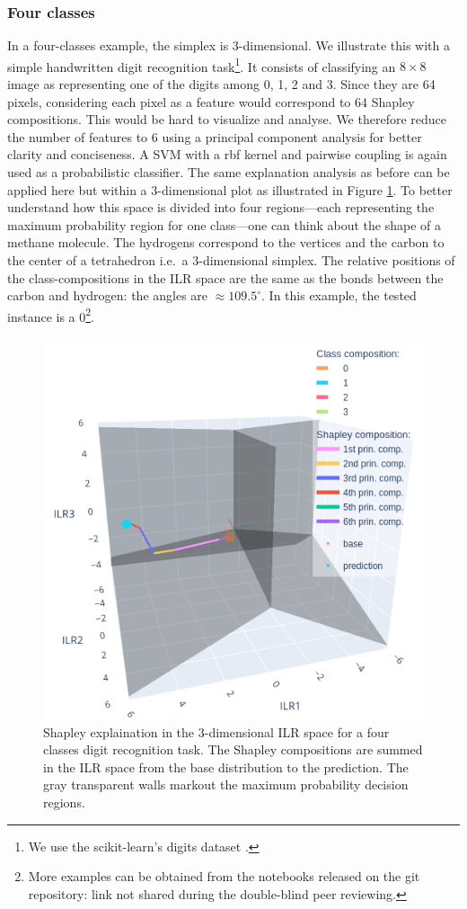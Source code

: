 \documentclass{article}
\theoremstyle{plain}
\theoremstyle{definition}
\theoremstyle{remark}
\begin{document}
\subsubsection{Four classes}

In a four-classes example, the simplex is $3$-dimensional. We illustrate this with a simple handwritten digit recognition task\footnote{We use the scikit-learn's digits dataset \cite{pedregosa2011scikit}.}. It consists of classifying an $8\times8$ image as representing one of the digits among 0, 1, 2 and 3. Since they are 64 pixels, considering each pixel as a feature would correspond to 64 Shapley compositions. This would be hard to visualize and analyse. We therefore reduce the number of features to 6 using a principal component analysis for better clarity and conciseness. A SVM with a rbf kernel and pairwise coupling is again used as a probabilistic classifier. The same explanation analysis as before can be applied here but within a $3$-dimensional plot as illustrated in Figure \ref{fig:4classesshapsum}. To better understand how this space is divided into four regions---each representing the maximum probability region for one class---one can think about the shape of a methane molecule. The hydrogens correspond to the vertices and the carbon to the center of a tetrahedron i.e.~a $3$-dimensional simplex. The relative positions of the class-compositions in the ILR space are the same as the bonds between the carbon and hydrogen: the angles are $\approx 109.5^{\circ}$. In this example, the tested instance is a 0\footnote{More examples can be obtained from the notebooks released on the git repository: link not shared during the double-blind peer reviewing.}.
\begin{figure}
  \centering
  \includegraphics[width=0.9\linewidth]{figures/4classes/ilrplotsum.png}
  \caption{Shapley explaination in the $3$-dimensional ILR space for a four classes digit recognition task. The Shapley compositions are summed in the ILR space from the base distribution to the prediction. The gray transparent walls markout the maximum probability decision regions.}
  \label{fig:4classesshapsum}
\end{figure}
\end{document}
